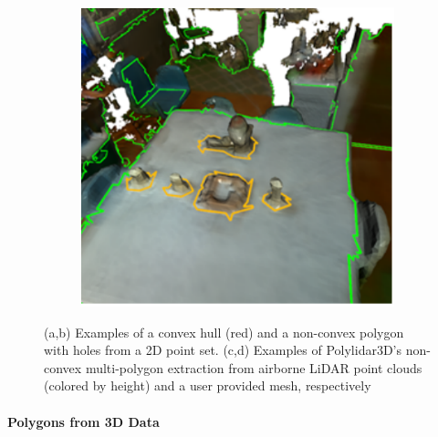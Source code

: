 \begin{figure}[t]
\begin{subfigure}[t]{.26\linewidth}
    \caption{\label{fig:ch1_rooftop_polygon}}
  \end{subfigure}
  \begin{subfigure}[t]{.26\linewidth}
    \centering\includegraphics[width=.95\linewidth]{chapter_1_intro/imgs/mesh_example_simple.pdf}
    \caption{\label{fig:ch1_mesh_polygon}}
  \end{subfigure}
  \caption{(a,b) Examples of a convex hull (red) and a non-convex polygon with holes from a 2D point set. (c,d) Examples of Polylidar3D's non-convex multi-polygon extraction from airborne LiDAR point clouds (colored by height) and a user provided mesh, respectively}\label{fig:ch1_polygon_examples}
\end{figure}


\paragraph{Polygons from 3D Data}

